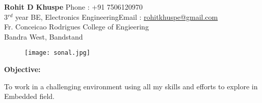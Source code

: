 \documentclass[a4paper]{article}
\begin{document}
	\begin{flushleft}
		\large\textbf{Rohit D Khuspe} \hfill{Phone : +91 7506120970}\\
		3$^{rd}$ year BE, Electronics Engineering\hfill{Email : \underline{rohitkhuspe@gmail.com}}\\
		Fr. Conceicao Rodrigues College of Engieering\\
		Bandra West, Bandstand
		
	\end{flushleft}
	\begin{figure}[h]
		\begin{flushright}
			\vspace{-0.5in}
			\texttt{[image: sonal.jpg]}
		\end{flushright}
	\end{figure}
	\hline

    \begin{flushleft}
    \begin{Large}\textbf{Objective:}\end{Large} \hspace{0.05in}To work in a challenging environment using all my skills and efforts to explore in\\\hspace{1.075in} Embedded field.
   
    \end{flushleft}
    
	
\end{document}
